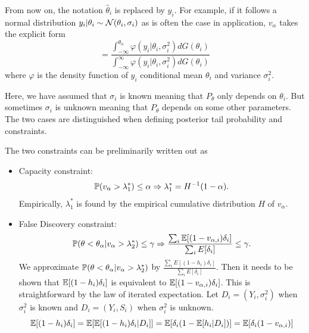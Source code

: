 \documentclass[12pt]{article}
\begin{document}
From now on, the notation $\hat{\theta}_i$ is replaced by $y_i$. For example,
if it follows a normal distribution $y_i|\theta_i \sim
    \mathcal{N}(\theta_i,\sigma_i)$ as is often the case in application, $v_\alpha$ takes
the explicit form
\begin{equation*}
    = \frac{{\int_{-\infty}^{\theta_{\alpha}}\varphi(y_i|\theta_i, \sigma_i^2) dG(\theta_i)}}
    {{\int_{-\infty}^{\infty} \varphi(y_i|\theta_i, \sigma_i^2) dG(\theta_i)}}
\end{equation*} where $\varphi$ is the density function of $y_i$ conditional mean $\theta_i$ and variance $\sigma_i^2$.

Here, we have assumed that $\sigma_i$ is known meaning that $P_\theta$ only
depends on $\theta_i$. But sometimes $\sigma_i$ is unknown meaning that
$P_\theta$ depends on some other parameters. The two cases are distinguished
when defining posterior tail probability and constraints.

The two constraints can be preliminarily written out as
\begin{itemize}
    \item Capacity constraint: \[ \mathbb{P}(v_\alpha>\lambda_1^*) \le \alpha \Rightarrow \lambda_1^* = H^{-1}(1-\alpha). \] Empirically, $\lambda_1^*$ is found by the empirical cumulative distribution
          $H$ of $v_\alpha$.
    \item False Discovery constraint: \[ \mathbb{P}(\theta<\theta_\alpha|v_\alpha>\lambda_2^*) \le \gamma \Rightarrow  \frac{\sum_i \mathbb{E}[(1-v_{\alpha,i})\delta_i]}{\sum_i E[ \delta_i]}\le \gamma.\] We approximate $\mathbb{P}(\theta<\theta_\alpha|v_\alpha>\lambda_2^*)$ by $\frac{\sum_i
                  E[ (1-h_i)\delta_i]}{\sum_i E[ \delta_i]}$. Then it needs to be shown that $\mathbb{E}[
                  (1-h_i)\delta_i]$ is equivalent to $\mathbb{E}[(1-v_{\alpha,i})\delta_i]$. This is
          straightforward by the law of iterated expectation. Let $D_i =
              (Y_i,\sigma_i^2)$ when $\sigma_i^2$ is known and $D_i = (Y_i,S_i)$ when
          $\sigma_i^2$ is unknown.
          \[ \mathbb{E}[(1-h_i)\delta_i] = \mathbb{E}[\mathbb{E}[(1-h_i)\delta_i|D_i]] = \mathbb{E}[\delta_i(1-\mathbb{E}[h_i|D_i])] = \mathbb{E}[\delta_i(1-v_{\alpha,i})] \]
\end{itemize}
\end{document}
